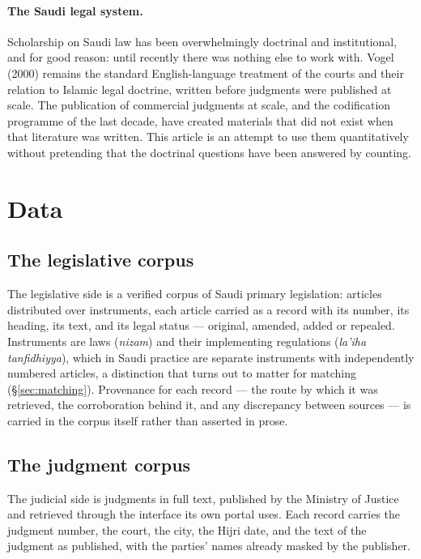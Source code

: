 \documentclass[11pt]{article}
\begin{document}
\paragraph{The Saudi legal system.} Scholarship on Saudi law has been
overwhelmingly doctrinal and institutional, and for good reason: until
recently there was nothing else to work with. Vogel (2000) remains the
standard English-language treatment of the courts and their relation to
Islamic legal doctrine, written before judgments were published at scale.
The publication of commercial judgments at scale, and the codification
programme of the last decade, have created materials that did not exist when
that literature was written. This article is an attempt to use them
quantitatively without pretending that the doctrinal questions have been
answered by counting.

\section{Data}
\label{sec:data}

\subsection{The legislative corpus}

The legislative side is a verified corpus of Saudi primary legislation:
\nRegistryArticles{} articles distributed over \nInstruments{} instruments,
each article carried as a record with its number, its heading, its text, and
its legal status --- original, amended, added or repealed. Instruments are
laws (\emph{nizam}) and their implementing regulations
(\emph{la'iha tanfidhiyya}), which
in Saudi practice are separate instruments with independently numbered
articles, a distinction that turns out to matter for matching
(§\ref{sec:matching}). Provenance for each record --- the route by which it
was retrieved, the corroboration behind it, and any discrepancy between
sources --- is carried in the corpus itself rather than asserted in prose.

\subsection{The judgment corpus}

The judicial side is \nJudgments{} judgments in full text, published by the
Ministry of Justice and retrieved through the interface its own portal uses.
Each record carries the judgment number, the court, the city, the Hijri date,
and the text of the judgment as published, with the parties' names already
masked by the publisher.
\end{document}
